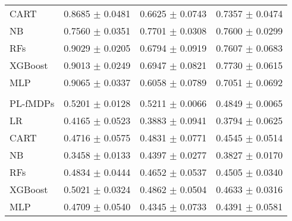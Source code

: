 \begin{table}[htbp]
\begin{tabular}{|l|ccc|}
CART & 0.8685 $\pm$ 0.0481 & 0.6625 $\pm$ 0.0743 & 0.7357 $\pm$ 0.0474 \\
NB & 0.7560 $\pm$ 0.0351 & 0.7701 $\pm$ 0.0308 & 0.7600 $\pm$ 0.0299 \\
RFs & 0.9029 $\pm$ 0.0205 & 0.6794 $\pm$ 0.0919 & 0.7607 $\pm$ 0.0683 \\
XGBoost & 0.9013 $\pm$ 0.0249 & 0.6947 $\pm$ 0.0821 & 0.7730 $\pm$ 0.0615 \\
MLP & 0.9065 $\pm$ 0.0337 & 0.6058 $\pm$ 0.0789 & 0.7051 $\pm$ 0.0692 \\
\midrule
\vspace{2mm}
\multicolumn{4}{|c|}{\textbf{Driver 4}} \\
\hline
PL-fMDPs & 0.5201 $\pm$ 0.0128 & 0.5211 $\pm$ 0.0066 & 0.4849 $\pm$ 0.0065 \\
LR & 0.4165 $\pm$ 0.0523 & 0.3883 $\pm$ 0.0941 & 0.3794 $\pm$ 0.0625 \\
CART & 0.4716 $\pm$ 0.0575 & 0.4831 $\pm$ 0.0771 & 0.4545 $\pm$ 0.0514 \\
NB & 0.3458 $\pm$ 0.0133 & 0.4397 $\pm$ 0.0277 & 0.3827 $\pm$ 0.0170 \\
RFs & 0.4834 $\pm$ 0.0444 & 0.4652 $\pm$ 0.0537 & 0.4505 $\pm$ 0.0340 \\
XGBoost & 0.5021 $\pm$ 0.0324 & 0.4862 $\pm$ 0.0504 & 0.4633 $\pm$ 0.0316 \\
MLP & 0.4709 $\pm$ 0.0540 & 0.4345 $\pm$ 0.0733 & 0.4391 $\pm$ 0.0581 \\
\hline
\end{tabular}
\end{table}